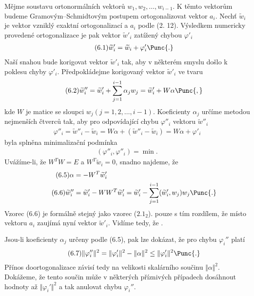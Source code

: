 Mějme soustavu ortonormálních vektorů $w_1,w_2,\dots,w_{i-1}$. K těmto
vektorům budeme Gra\-mo\-vým--Schmidtovým postupem ortogonalizovat
vektor $a_i$.  Nechť $\widetilde w_i$ je vektor vzniklý exaktní
ortogonalizací a $a_i$ podle (2. 12).  Výsledkem numericky
provedené ortogonalizace je pak vektor $\widetilde w'_i$ zatížený
chybou $\varphi'_i$
%
\begin{align*}
  \tag{6.1}
  {\widetilde w}'_i = \widetilde w_i + \varphi'_i \Punc{.}
\end{align*}
%
Naší snahou bude korigovat vektor $\widetilde w'_i$ tak, aby v
některém smyslu došlo k poklesu chyby $\varphi'_i.$ Předpokládejme
korigovaný vektor $\widetilde w'_i$ ve tvaru
%
\begin{align*}
  \tag{6.2}
  \widetilde w''_i = \widetilde w'_i
  + \sum_{j=1}^{i-1} \alpha_jw_j = \widetilde w'_i + W\alpha
  \Punc{,}
\end{align*}
%
kde $W$ je matice se sloupci $w_j (j=1,2,\dots,i-1)$.  Koeficienty
$\alpha_j$ určíme metodou nejmenších čtverců tak, aby pro odpovídající
chybu $\varphi''_i$ vektoru $\widetilde w''_i$
%
\begin{align*}
  \tag{6.3}
  \varphi''_i = \widetilde w''_i - \widetilde w_i =
  W\alpha + (\widetilde w''_i - \widetilde w_i)  =
  W\alpha + \varphi'_i
\end{align*}
%
byla splněna minimalizační podmínka
%
\begin{align*}
  \tag{6.4}
  (\varphi''_i,\varphi''_i) = \min.
\end{align*}
%
Uvážíme-li, že $W^TW = E$ a $W^T\widetilde w_i = 0$, snadno najdeme,
že
%
\begin{align*}
  \tag{6.5}
  \alpha &= -W^T\widetilde w'_i \\
  \tag{6.6}
  \widetilde w''_i &= \widetilde w'_i - WW^T\widetilde w'_i =
  \widetilde w'_i -
  \sum_{j=1}^{i-1}(\widetilde w'_i,w_j)w_j \Punc{.}
\end{align*}
%
Vzorec (6.6) je formálně stejný jako vzorec ($2.1_2$). pouze s tím
rozdílem, že místo vektoru $a_i$ zaujímá nyní vektor $\widetilde
w'_i$. Vidíme tedy, že .


Jsou-li koeficienty $\alpha_j$ určeny podle (6.5), pak lze dokázat,
že pro chybu $\varphi_i''$ platí
%
\begin{align*}
  \tag{6.7}
  \Vert\varphi_i''\Vert^2 =
  \Vert\varphi_i'\Vert^2 - \Vert\alpha\Vert^2 \le \Vert\varphi_i'\Vert^2 \Punc{.}
\end{align*}
%
Přínos  doortogonalizace závisí tedy na velikosti skalárního
součinu $\Vert\alpha\Vert^2$. Dokážeme, že tento součin může v některých
příznivých případech dosáhnout hodnoty až $\Vert\varphi_i'\Vert^2$ a tak
anulovat chybu $\varphi_i''$.


